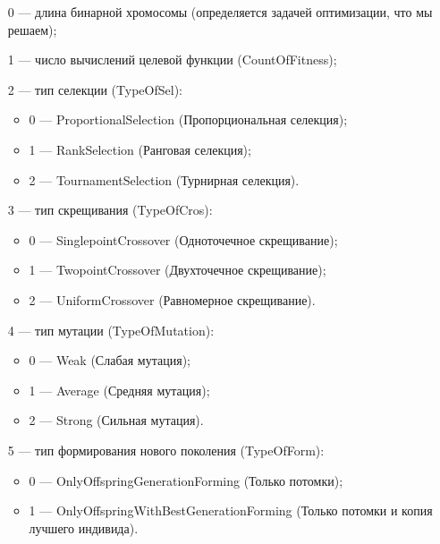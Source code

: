 \documentclass[a4paper,12pt]{article}
\begin{document}
 \begin{itemize}
 \item [0] --- длина бинарной хромосомы (определяется задачей оптимизации, что мы решаем);
 
 \item [1] --- число вычислений целевой функции (CountOfFitness);
 
 \item [2] --- тип селекции (TypeOfSel):
 
 \begin{itemize}
       \item 0 --- ProportionalSelection (Пропорциональная селекция);
 
       \item 1 --- RankSelection (Ранговая селекция);
 
       \item 2 --- TournamentSelection (Турнирная селекция).
	    \end{itemize}
 
 \item [3] --- тип скрещивания (TypeOfCros):
  \begin{itemize}
       \item 0 --- SinglepointCrossover (Одноточечное скрещивание);
 
       \item 1 --- TwopointCrossover (Двухточечное скрещивание);
 
       \item 2 --- UniformCrossover (Равномерное скрещивание).
	    \end{itemize}
 
 \item [4] --- тип мутации (TypeOfMutation):
  \begin{itemize}
       \item 0 --- Weak (Слабая мутация);
 
       \item 1 --- Average (Средняя мутация);
 
       \item 2 --- Strong (Сильная мутация).
	    \end{itemize}
 
 \item [5] --- тип формирования нового поколения (TypeOfForm):
  \begin{itemize}
       \item 0 --- OnlyOffspringGenerationForming (Только потомки);
 
       \item 1 --- OnlyOffspringWithBestGenerationForming (Только потомки и копия лучшего индивида).
	    \end{itemize}
 \end{itemize}
 
\end{document}
